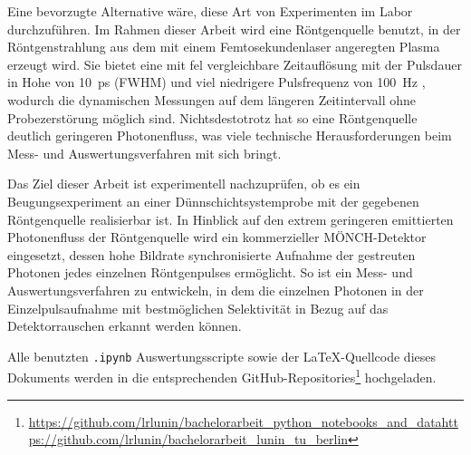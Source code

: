 \noindent
Eine bevorzugte Alternative wäre, diese Art von Experimenten im Labor durchzuführen. Im Rahmen dieser Arbeit wird eine Röntgenquelle benutzt, in der Röntgenstrahlung aus dem mit einem Femtosekundenlaser angeregten Plasma erzeugt wird. Sie bietet eine mit \gls{fel} vergleichbare Zeitauflösung mit der Pulsdauer in Hohe von \SI{10}{\pico\second} (FWHM) und viel niedrigere Pulsfrequenz von \SI{100}{\hertz} \cite{schick_laser-driven_2021}, wodurch die dynamischen Messungen auf dem längeren Zeitintervall ohne Probezerstörung möglich sind. Nichtsdestotrotz hat so eine Röntgenquelle deutlich geringeren Photonenfluss, was viele technische Herausforderungen beim Mess- und Auswertungsverfahren mit sich bringt.

\noindent
Das Ziel dieser Arbeit ist experimentell nachzuprüfen, ob es ein Beugungsexperiment an einer Dünnschichtsystemprobe mit der gegebenen Röntgenquelle realisierbar ist. In Hinblick auf den extrem geringeren emittierten Photonenfluss der Röntgenquelle wird ein kommerzieller MÖNCH-Detektor \cite{ramilli-measurements-2017} eingesetzt, dessen hohe Bildrate synchronisierte Aufnahme der gestreuten Photonen jedes einzelnen Röntgenpulses ermöglicht. So ist ein Mess- und Auswertungsverfahren zu entwickeln, in dem die einzelnen Photonen in der Einzelpulsaufnahme mit bestmöglichen Selektivität in Bezug auf das Detektorrauschen erkannt werden können.

\noindent%
Alle benutzten \texttt{.ipynb} Auswertungsscripte sowie der \LaTeX-Quellcode dieses Dokuments werden in die entsprechenden GitHub-Repositories\footnote{\url{https://github.com/lrlunin/bachelorarbeit_python_notebooks_and_data}\newline\url{https://github.com/lrlunin/bachelorarbeit_lunin_tu_berlin}} hochgeladen.   


